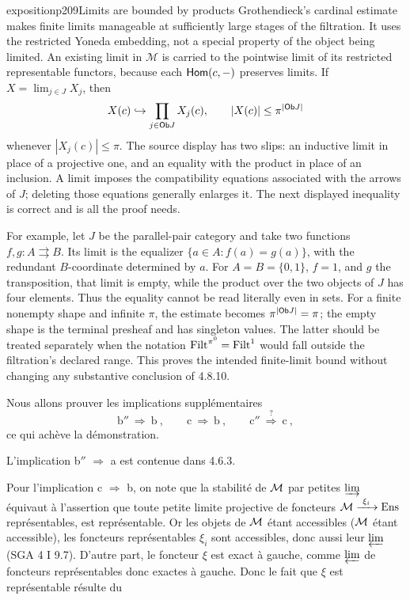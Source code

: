 \begin{dcomment}{exposition}{p209}{Limits are bounded by products}
Grothendieck's cardinal estimate makes finite limits manageable at sufficiently large stages of the filtration. It uses the restricted Yoneda embedding, not a special property of the object being limited. An existing limit in $\mathcal M$ is carried to the pointwise limit of its restricted representable functors, because each $\mathsf{Hom}(c,-)$ preserves limits. If $X=\lim_{j\in J}X_j$, then
\[
 X(c)\hookrightarrow\prod_{j\in\mathsf{Ob} J}X_j(c),
 \qquad |X(c)|\leq\pi^{|\mathsf{Ob} J|}
\]
whenever $|X_j(c)|\leq\pi$. The source display has two slips: an inductive limit in place of a projective one, and an equality with the product in place of an inclusion. A limit imposes the compatibility equations associated with the arrows of $J$; deleting those equations generally enlarges it. The next displayed inequality is correct and is all the proof needs.

For example, let $J$ be the parallel-pair category and take two functions $f,g:A\rightrightarrows B$. Its limit is the equalizer $\{a\in A:f(a)=g(a)\}$, with the redundant $B$-coordinate determined by $a$. For $A=B=\{0,1\}$, $f=1$, and $g$ the transposition, that limit is empty, while the product over the two objects of $J$ has four elements. Thus the equality cannot be read literally even in sets. For a finite nonempty shape and infinite $\pi$, the estimate becomes $\pi^{|\mathsf{Ob} J|}=\pi$; the empty shape is the terminal presheaf and has singleton values. The latter should be treated separately when the notation $\mathrm{Filt}^{\pi^0}=\mathrm{Filt}^1$ would fall outside the filtration's declared range. This proves the intended finite-limit bound without changing any substantive conclusion of 4.8.10.
\end{dcomment}


Nous allons prouver les implications supplémentaires
\[
\text{b}'' \ \Longrightarrow\ \text{b}\ , \qquad \text{c} \ \Longrightarrow\ \text{b}\ , \qquad \text{c}'' \ \overset{?}{\Longrightarrow}\ \text{c}\ ,
\]
ce qui achève la démonstration.

L'implication b$''$ $\Longrightarrow$ a est contenue dans 4.6.3.

Pour l'implication c $\Longrightarrow$ b, on note que la stabilité de $\mathcal{M}$ par petites $\varinjlim$ équivaut à l'assertion que toute petite limite projective de foncteurs $\mathcal{M} \xrightarrow{\ \xi_i\ } \mathrm{Ens}$ représentables, est représentable. Or les objets de $\mathcal{M}$ étant accessibles ($\mathcal{M}$ étant accessible), les foncteurs représentables $\xi_i$ sont accessibles, donc aussi leur $\varprojlim$ (SGA 4 I 9.7). D'autre part, le foncteur $\xi$ est exact à gauche, comme $\varprojlim$ de foncteurs représentables donc exactes à gauche. Donc le fait que $\xi$ est représentable résulte du %

